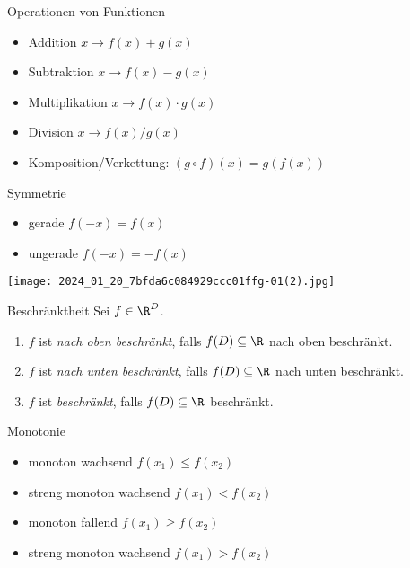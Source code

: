 \begin{theorem}{Operationen von Funktionen}
    \begin{itemize}
  \item Addition $x \rightarrow f(x)+g(x)$
  \item Subtraktion $x \rightarrow f(x)-g(x)$
  \item Multiplikation $x \rightarrow f(x) \cdot g(x)$
    \item Division $x \rightarrow f(x) / g(x)$
\end{itemize}



\begin{itemize}
  \item Komposition/Verkettung: $(g \circ f)(x)=g(f(x))$
\end{itemize}
\end{theorem}

\begin{definition}{Symmetrie}
\begin{itemize}
  \item gerade $f(-x)=f(x)$
  \item ungerade $f(-x)=-f(x)$
\end{itemize}
\end{definition}

\begin{center}
    \texttt{[image: 2024\_01\_20\_7bfda6c084929ccc01ffg-01(2).jpg]}
\end{center}

\begin{definition}{Beschränktheit}
    Sei $f \in \R^D$.
    \begin{enumerate}
        \item $f$ ist \emph{nach oben beschränkt}, falls $f(D) \subseteq \R$ nach oben beschränkt.
        \item $f$ ist \emph{nach unten beschränkt}, falls $f(D) \subseteq \R$ nach unten beschränkt.
        \item $f$ ist \emph{beschränkt}, falls $f(D) \subseteq \R$ beschränkt.
    \end{enumerate}
\end{definition}

\begin{definition}{Monotonie}
    \begin{itemize}
  \item monoton wachsend $f\left(x_{1}\right) \leq f\left(x_{2}\right)$
  \item streng monoton wachsend $f\left(x_{1}\right)<f\left(x_{2}\right)$
  \item monoton fallend $f\left(x_{1}\right) \geq f\left(x_{2}\right)$
  \item streng monoton wachsend $f\left(x_{1}\right)>f\left(x_{2}\right)$
\end{itemize}
\end{definition}


